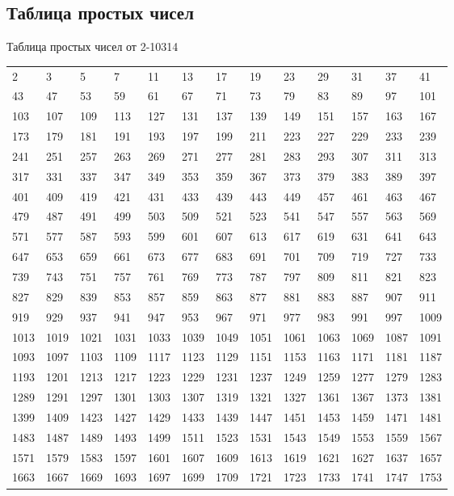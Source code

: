 \documentclass[12pt, a6paper]{extarticle}
\begin{document}
\subsection{Таблица простых чисел}

Таблица простых чисел от 2-10314

\begin{longtable}{lllll lllll lll}
2 &3 &5 &7 &11 &13 &17 &19 &23 &29 &31 &37 &41 \\
43 &47 &53 &59 &61 &67 &71 &73 &79 &83 &89 &97 &101 \\
103 &107 &109 &113 &127 &131 &137 &139 &149 &151 &157 &163 &167 \\
173 &179 &181 &191 &193 &197 &199 &211 &223 &227 &229 &233 &239 \\
241 &251 &257 &263 &269 &271 &277 &281 &283 &293 &307 &311 &313 \\
317 &331 &337 &347 &349 &353 &359 &367 &373 &379 &383 &389 &397 \\
401 &409 &419 &421 &431 &433 &439 &443 &449 &457 &461 &463 &467 \\
479 &487 &491 &499 &503 &509 &521 &523 &541 &547 &557 &563 &569 \\
571 &577 &587 &593 &599 &601 &607 &613 &617 &619 &631 &641 &643 \\
647 &653 &659 &661 &673 &677 &683 &691 &701 &709 &719 &727 &733 \\
739 &743 &751 &757 &761 &769 &773 &787 &797 &809 &811 &821 &823 \\
827 &829 &839 &853 &857 &859 &863 &877 &881 &883 &887 &907 &911 \\
919 &929 &937 &941 &947 &953 &967 &971 &977 &983 &991 &997 &1009 \\
1013 &1019 &1021 &1031 &1033 &1039 &1049 &1051 &1061 &1063 &1069 &1087 &1091 \\
1093 &1097 &1103 &1109 &1117 &1123 &1129 &1151 &1153 &1163 &1171 &1181 &1187 \\
1193 &1201 &1213 &1217 &1223 &1229 &1231 &1237 &1249 &1259 &1277 &1279 &1283 \\
1289 &1291 &1297 &1301 &1303 &1307 &1319 &1321 &1327 &1361 &1367 &1373 &1381 \\
1399 &1409 &1423 &1427 &1429 &1433 &1439 &1447 &1451 &1453 &1459 &1471 &1481 \\
1483 &1487 &1489 &1493 &1499 &1511 &1523 &1531 &1543 &1549 &1553 &1559 &1567 \\
1571 &1579 &1583 &1597 &1601 &1607 &1609 &1613 &1619 &1621 &1627 &1637 &1657 \\
1663 &1667 &1669 &1693 &1697 &1699 &1709 &1721 &1723 &1733 &1741 &1747 &1753 \\

\end{longtable}
\end{document}
